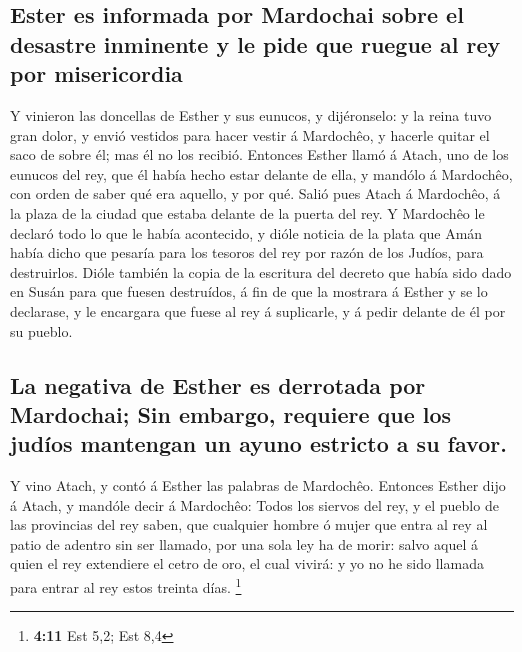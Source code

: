 \hypertarget{ester-es-informada-por-mardochai-sobre-el-desastre-inminente-y-le-pide-que-ruegue-al-rey-por-misericordia}{%
\subsection{Ester es informada por Mardochai sobre el desastre inminente
y le pide que ruegue al rey por
misericordia}\label{ester-es-informada-por-mardochai-sobre-el-desastre-inminente-y-le-pide-que-ruegue-al-rey-por-misericordia}}

 Y vinieron las doncellas de Esther y sus eunucos, y
dijéronselo: y la reina tuvo gran dolor, y envió vestidos para hacer
vestir á Mardochêo, y hacerle quitar el saco de sobre él; mas él no los
recibió.  Entonces Esther llamó á Atach, uno de los
eunucos del rey, que él había hecho estar delante de ella, y mandólo á
Mardochêo, con orden de saber qué era aquello, y por qué. 
Salió pues Atach á Mardochêo, á la plaza de la ciudad que estaba delante
de la puerta del rey.  Y Mardochêo le declaró todo lo que
le había acontecido, y dióle noticia de la plata que Amán había dicho
que pesaría para los tesoros del rey por razón de los Judíos, para
destruirlos.  Dióle también la copia de la escritura del
decreto que había sido dado en Susán para que fuesen destruídos, á fin
de que la mostrara á Esther y se lo declarase, y le encargara que fuese
al rey á suplicarle, y á pedir delante de él por su pueblo.

\hypertarget{la-negativa-de-esther-es-derrotada-por-mardochai-sin-embargo-requiere-que-los-juduxedos-mantengan-un-ayuno-estricto-a-su-favor.}{%
\subsection{La negativa de Esther es derrotada por Mardochai; Sin
embargo, requiere que los judíos mantengan un ayuno estricto a su
favor.}\label{la-negativa-de-esther-es-derrotada-por-mardochai-sin-embargo-requiere-que-los-juduxedos-mantengan-un-ayuno-estricto-a-su-favor.}}

 Y vino Atach, y contó á Esther las palabras de Mardochêo.
 Entonces Esther dijo á Atach, y mandóle decir á
Mardochêo:  Todos los siervos del rey, y el pueblo de las
provincias del rey saben, que cualquier hombre ó mujer que entra al rey
al patio de adentro sin ser llamado, por una sola ley ha de morir: salvo
aquel á quien el rey extendiere el cetro de oro, el cual vivirá: y yo no
he sido llamada para entrar al rey estos treinta días. \footnote{\textbf{4:11}
  Est 5,2; Est 8,4}

